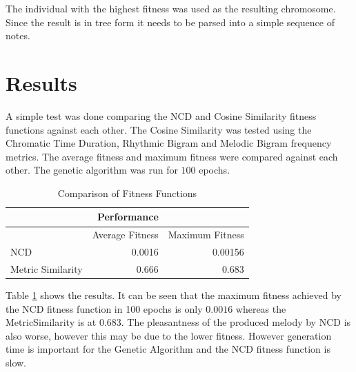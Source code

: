 The individual with the highest fitness was used as the resulting chromosome. 
Since the result is in tree form it needs to be parsed into a simple sequence of notes.

\section{Results}


A simple test was done comparing the \ac{NCD} and Cosine Similarity fitness functions against each other. The Cosine Similarity was tested using the Chromatic Time Duration, Rhythmic Bigram and Melodic Bigram frequency metrics. The average fitness and maximum fitness were compared against each other. The genetic algorithm was run for $100$ epochs.

\begin{table}[htbp]
  \centering
  \caption{Comparison of Fitness Functions}
    \begin{tabular}{l|rr}
    \toprule
          & Performance &  \\
    \midrule
          & Average Fitness & Maximum Fitness \\
    NCD   & 0.0016 & 0.00156 \\
    Metric Similarity & 0.666 & 0.683 \\
    \bottomrule
    \end{tabular}%
  \label{tab:ffcompare}%
\end{table}%

Table \ref{tab:ffcompare} shows the results. It can be seen that the maximum fitness achieved by the \ac{NCD} fitness function in 100 epochs is only $0.0016$ whereas the MetricSimilarity is at $0.683$. The pleasantness of the produced melody by \ac{NCD} is also worse, however this may be due to the lower fitness.
However generation time is important for the Genetic Algorithm and the \ac{NCD} fitness function is slow.


